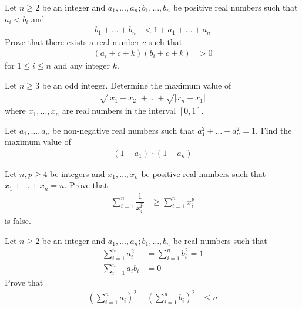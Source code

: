 \documentclass{subfile}
\begin{document}
		\begin{problem}
			Let $n\geq2$ be an integer and $a_{1},\ldots,a_{n};b_{1},\ldots,b_{n}$ be positive real numbers such that $a_{i}<b_{i}$ and
				\begin{align*}
					b_{1}+\ldots+b_{n}
						& < 1+a_{1}+\ldots+a_{n}
				\end{align*}
			Prove that there exists a real number $c$ such that
				\begin{align*}
					(a_{i}+c+k)(b_{i}+c+k)
						& > 0
				\end{align*}
			for $1\leq i\leq n$ and any integer $k$.
		\end{problem}
	
		\begin{problem}
			Let $n\geq 3$ be an odd integer. Determine the maximum value of
				\begin{align*}
					\sqrt{|x_{1}-x_{2}|}+\ldots+\sqrt{|x_{n}-x_{1}|}
				\end{align*}
			where $x_{1},\ldots,x_{n}$ are real numbers in the interval $[0,1]$.
		\end{problem}
	
		\begin{problem}
			Let $a_{1},\ldots,a_{n}$ be non-negative real numbers such that $a_{1}^{2}+\ldots+a_{n}^{2}=1$. Find the maximum value of
				\begin{align*}
					(1-a_{1})\cdots(1-a_{n})
				\end{align*}
		\end{problem}
	
		\begin{problem}
			Let $n,p\geq 4$ be integers and $x_{1},\ldots,x_{n}$ be positive real numbers such that $x_{1}+\ldots+x_{n}=n$. Prove that
				\begin{align*}
					\sum_{i=1}^{n}\dfrac{1}{x_{i}^{p}}
						& \geq \sum_{i=1}^{n}x_{i}^{p}
				\end{align*}
			is false.
		\end{problem}
	
		\begin{problem}
			Let $n\geq 2$ be an integer and $a_{1},\ldots,a_{n};b_{1},\ldots,b_{n}$ be real numbers such that
				\begin{align*}
					\sum_{i=1}^{n}a_{i}^{2}
						& = \sum_{i=1}^{n}b_{i}^{2}=1\\
					\sum_{i=1}^{n}a_{i}b_{i}
						& = 0
				\end{align*}
			Prove that
				\begin{align*}
					\left(\sum_{i=1}^{n}a_{i}\right)^{2}+\left(\sum_{i=1}^{n}b_{i}\right)^{2}
						& \leq n
				\end{align*}
		\end{problem}
	
\end{document}
